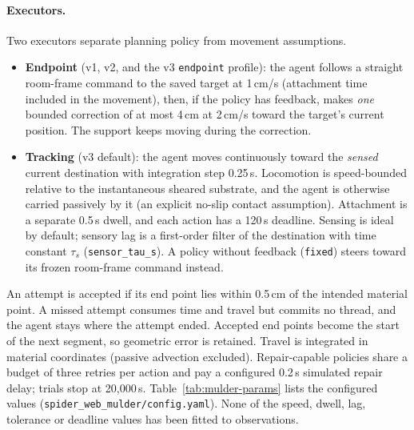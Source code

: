 \paragraph{Executors.} Two executors separate planning policy from movement assumptions.
\begin{itemize}
  \item \textbf{Endpoint} (v1, v2, and the v3 \texttt{endpoint} profile): the agent follows a straight
  room-frame command to the saved target at 1\,cm/s (attachment time included in the movement), then,
  if the policy has feedback, makes \emph{one} bounded correction of at most 4\,cm at 2\,cm/s toward the
  target's current position. The support keeps moving during the correction.
  \item \textbf{Tracking} (v3 default): the agent moves continuously toward the \emph{sensed} current
  destination with integration step 0.25\,s. Locomotion is speed-bounded relative to the instantaneous
  sheared substrate, and the agent is otherwise carried passively by it (an explicit no-slip contact
  assumption). Attachment is a separate 0.5\,s dwell, and each action has a 120\,s deadline. Sensing is
  ideal by default; sensory lag is a first-order filter of the destination with time constant
  $\tau_s$ (\texttt{sensor\_\allowbreak{}tau\_\allowbreak{}s}). A policy without feedback (\texttt{fixed}) steers toward its frozen
  room-frame command instead.
\end{itemize}
An attempt is accepted if its end point lies within 0.5\,cm of the intended material point. A missed
attempt consumes time and travel but commits no thread, and the agent stays where the attempt ended.
Accepted end points become the start of the next segment, so geometric error is retained. Travel is
integrated in material coordinates (passive advection excluded). Repair-capable policies share a budget
of three retries per action and pay a configured 0.2\,s simulated repair delay; trials stop at 20{,}000\,s.
Table~\ref{tab:mulder-params} lists the configured values (\texttt{spider\_\allowbreak{}web\_\allowbreak{}mulder/\allowbreak{}config.yaml}).
None of the speed, dwell, lag, tolerance or deadline values has been fitted to observations.


